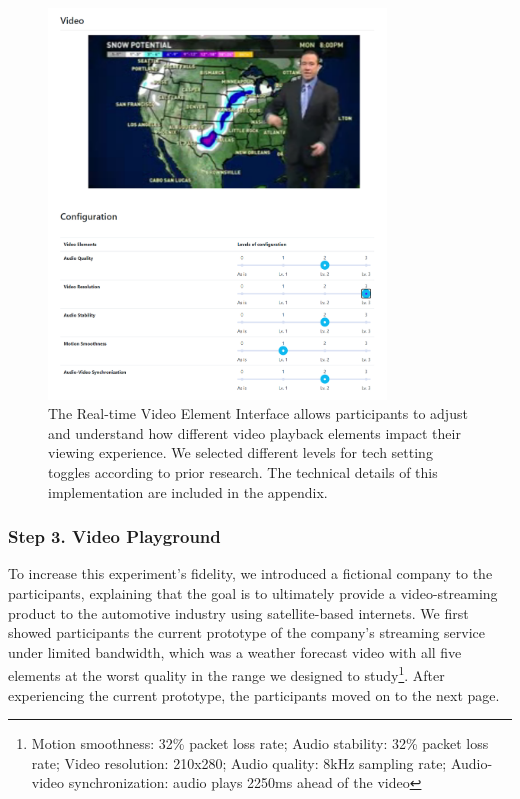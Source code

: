 \begin{figure}[htpb]
    \centering
    \includegraphics[width=0.8\textwidth, keepaspectratio=true]{content/image/video_playground.png}
    \caption{
        The Real-time Video Element Interface allows participants to adjust and understand how different video playback elements impact their viewing experience. We selected different levels for tech setting toggles according to prior research. The technical details of this implementation are included in the appendix.
    }
    \label{fig:exp2_playground}
\end{figure}


\subsubsection{Step 3. Video Playground}
To increase this experiment's fidelity, we introduced a fictional company to the participants, explaining that the goal is to ultimately provide a video-streaming product to the automotive industry using satellite-based internets. We first showed participants the current prototype of the company's streaming service under limited bandwidth, which was a weather forecast video with all five elements at the worst quality in the range we designed to study\footnote{Motion smoothness: 32\% packet loss rate; Audio stability: 32\% packet loss rate; Video resolution: 210x280; Audio quality: 8kHz sampling rate; Audio-video synchronization: audio plays 2250ms ahead of the video}. After experiencing the current prototype, the participants moved on to the next page.

